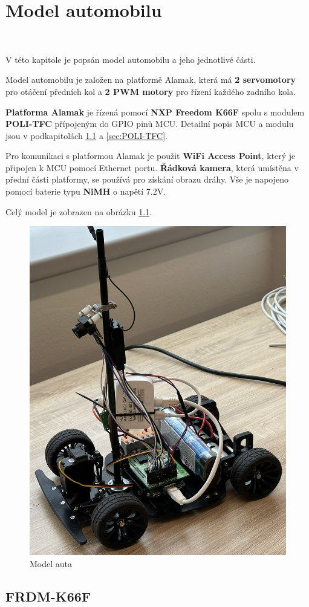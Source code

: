 \chapter{Model automobilu}
\label{sec:CarModel}\
\vspace{-30pt}

V této kapitole je popsán model automobilu a jeho jednotlivé části.

Model automobilu je založen na platformě Alamak, která má
\textbf{2 servomotory} pro otáčení předních kol a
\textbf{2 PWM motory} pro řízení každého
zadního kola.

\textbf{Platforma Alamak} je řízená pomocí \textbf{NXP Freedom K66F}\cite{frdmk66UserGuide} spolu
s modulem \textbf{POLI-TFC} přípojeným do GPIO pinů MCU.
Detailní popis MCU a modulu jsou v podkapitolách \ref{sec:FRDM-K66F}
a \ref{sec:POLI-TFC}.

Pro komunikaci s platformou Alamak je použit \textbf{WiFi Access Point}, který je připojen k MCU pomocí Ethernet portu. \textbf{Řádková kamera}, která umístěna v přední části platformy,
se používá pro získání obrazu dráhy. Vše je napojeno pomocí baterie typu \textbf{NiMH} o napětí 7.2V.

Celý model je zobrazen na obrázku \ref{fig:car}.
\begin{figure}[!h]
    \vspace{-10pt}
    \centering
    \includegraphics[width = .45\linewidth]{Figures/Car.jpeg}
    \caption{Model auta}
    \label{fig:car}
    \vspace{-10pt}
\end{figure}

\section{FRDM-K66F}
\label{sec:FRDM-K66F}\

